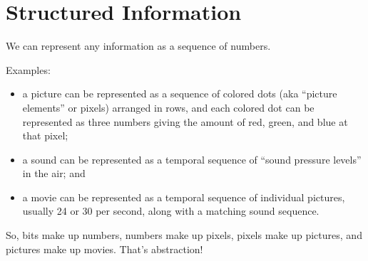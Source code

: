 \documentclass[8pt,a4paper,compress,handout]{beamer}
\begin{document}
\section{Structured Information}
\begin{frame}[fragile]
We can represent any information as a sequence of numbers.

\bigskip

Examples: 
\begin{itemize}
\item a picture can be represented as a sequence of colored dots (aka ``picture elements'' or pixels) arranged in rows, and each colored dot can be represented as three numbers giving the amount of red, green, and blue at that pixel;

\item a sound can be represented as a temporal sequence of ``sound pressure levels'' in the air; and 

\item a movie can be represented as a temporal sequence of individual pictures, usually 24 or 30 per second, along with a matching sound sequence.
\end{itemize}

\bigskip

So, bits make up numbers, numbers make up pixels, pixels make up pictures, and pictures make up movies. That's abstraction! 
\end{frame}
\end{document}
